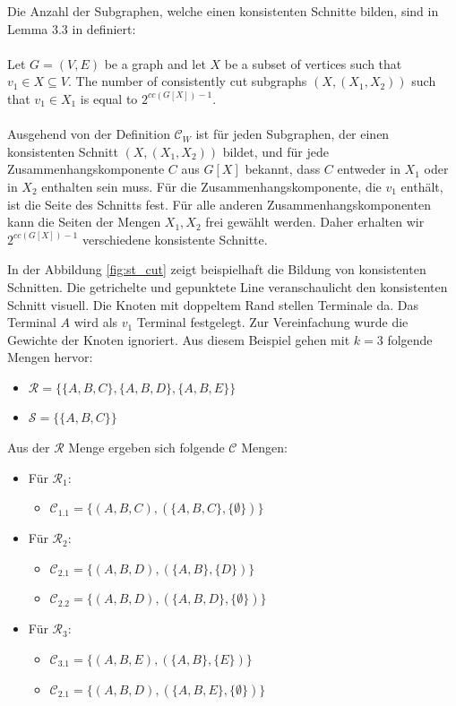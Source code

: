 Die Anzahl der Subgraphen, welche einen konsistenten Schnitte bilden, sind in Lemma 3.3 in \cite{cygan_solving_2011} definiert:\\
\\Let $G=(V,E)$ be a graph and let $X$ be a subset of vertices such that $v_1 \in X \subseteq V$. The number of consistently cut subgraphs $(X,(X_1,X_2))$ such that $v_1 \in X_1$ is equal to $2^{cc(G[X])-1}$.\\

\\Ausgehend von der Definition $\mathcal{C}_W$ ist für jeden Subgraphen, der einen konsistenten Schnitt $(X,(X_1,X_2))$ bildet, und für jede Zusammenhangskomponente $C$ aus $G[X]$ bekannt, dass  $C$ entweder in $X_1$ oder in $X_2$ enthalten sein muss. Für die Zusammenhangskomponente, die $v_1$ enthält, ist die Seite des Schnitts fest. Für alle anderen Zusammenhangskomponenten kann die Seiten der Mengen $X_1,X_2$ frei gewählt werden. Daher erhalten wir $2^{cc(G[X])-1}$ verschiedene konsistente Schnitte.

In der Abbildung \ref{fig:st_cut} zeigt beispielhaft die Bildung von konsistenten Schnitten. Die getrichelte und gepunktete Line veranschaulicht den konsistenten Schnitt visuell. Die Knoten mit doppeltem Rand stellen Terminale da. Das Terminal $A$ wird als $v_1$ Terminal festgelegt. Zur Vereinfachung wurde die Gewichte der Knoten ignoriert.
Aus diesem Beispiel gehen mit $k=3$ folgende Mengen hervor:
\begin{itemize}
\item $\mathcal{R} = \{\{A,B,C\}, \{A,B,D\}, \{A,B,E\}\}$
\item $\mathcal{S} = \{\{A,B,C\}\}$
\end{itemize}

Aus der $\mathcal{R}$ Menge ergeben sich folgende $\mathcal{C}$ Mengen:
\begin{itemize}
\item Für $\mathcal{R}_1$:
\begin{itemize}
\item $\mathcal{C}_{1.1} = \{(A,B,C),  (\{A,B,C\}, \{\emptyset\})\}$
\end{itemize}
\item Für $\mathcal{R}_2$:
\begin{itemize}
\item $\mathcal{C}_{2.1} = \{(A,B,D),  (\{A,B\}, \{D\})\}$
\item $\mathcal{C}_{2.2} = \{(A,B,D),  (\{A,B,D\}, \{\emptyset\})\}$ 
\end{itemize}
\item Für $\mathcal{R}_3$:
\begin{itemize}
\item $\mathcal{C}_{3.1} = \{(A,B,E),  (\{A,B\}, \{E\})\}$
\item $\mathcal{C}_{2.1} = \{(A,B,D),  (\{A,B,E\}, \{\emptyset\})\}$
\end{itemize}
\end{itemize}

